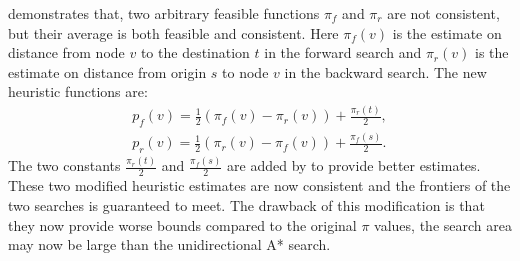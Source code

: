 \begin{comment}
\begin{figure}[H]
    \tikzstyle{main node} = [circle, draw, text centered, minimum height=2.5em]
    \tikzstyle{line} = [draw, -latex']
    \centering
    \begin{tikzpicture}[>=stealth', line width=1pt, auto, node distance=3cm]
        \node [main node] (s) at (0,0)  {s};
        \node [main node] (v) at (2,3)  {v};
        \node [main node] (w) at (7,4)  {w};
        \node [main node] (t) at (8,7)  {t};

        \path [line, dashed] (s) -- node [right] {$\pi_r(v)$} (v);
        \path [line, dashed] (s) -- node [right] {$\pi_r(w)$} (w);
        \path [line, dashed] (v) -- node {$\pi_f(v)$} (t);
        \path [line, dashed] (w) -- node [left] {$\pi_f(w)$} (t);

        \draw [line, out=300, in=200, bend left] (s.north) to node [left] {$c_{st}$} (v);
        \draw [line, out=70, in=45, bend right] (w.east) to node [right] {$c_{wt}$} (t.east);
        \draw [line] (v.east) to node [above] {$c_{vw}$} (w);
    \end{tikzpicture}
    \caption{Heuristic values for bidirectional A* search}
    \label{fig:bidirect_heuristic}
\end{figure}
\todoin[inline]{add $\pi_f(t) and \pi_r(s)$ for figure}
\end{comment}

\citet{Ikeda} demonstrates that, two arbitrary feasible functions $\pi_f$ and $\pi_r$ are not consistent, but their average is both feasible and consistent.
Here $\pi_f(v)$ is the estimate on distance from node $v$ to the destination $t$ in the forward search and $\pi_r(v)$ is the estimate on distance from origin $s$ to node $v$ in the backward search. 
The new heuristic functions are:
\begin{align}
    p_f(v) = \frac{1}{2}(\pi_f(v)-\pi_r(v)) + \frac{\pi_r(t)}{2}, \\
    p_r(v) = \frac{1}{2}(\pi_r(v)-\pi_f(v)) + \frac{\pi_f(s)}{2}.
\end{align}
The two constants $\frac{\pi_r(t)}{2}$ and $\frac{\pi_f(s)}{2}$ are added by \citet{GoldbergEPP} to provide better estimates.
These two modified heuristic estimates are now consistent and the frontiers of the two searches is guaranteed to meet.
The drawback of this modification is that they now provide worse bounds compared to the original $\pi$ values,
the search area may now be large than the unidirectional A* search.

